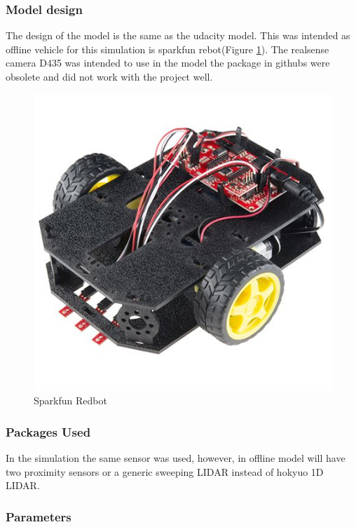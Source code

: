 \documentclass[10pt,journal,compsoc]{IEEEtran}
\begin{document}
\subsubsection{Model design}
The design of the model is the same as the udacity model. This was intended as offline vehicle for this simulation is sparkfun rebot(Figure \ref{fig:sparkfunredbot}).
The realsense camera D435 was intended to use in the model the package in githubs were obsolete and did not work with the project well.

\begin{figure}[thpb]
      \centering
      \includegraphics[width=\linewidth]{./img/sparkfunredbot.jpeg}
      \caption{Sparkfun Redbot}
      \label{fig:sparkfunredbot}
\end{figure}
\subsubsection{Packages Used}
In the simulation the same sensor was used, however, in offline model will have two proximity sensors or a generic sweeping LIDAR instead of hokyuo 1D LIDAR.

\subsubsection{Parameters}
\end{document}
